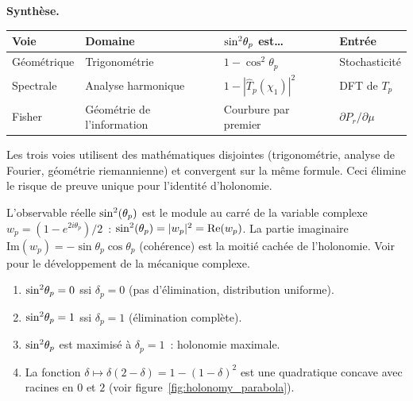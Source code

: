 \documentclass[12pt,a4paper]{article}
\begin{document}
\begin{remarque}
\medskip\noindent
\textbf{Synthèse.}
\begin{center}
\begin{tabular}{llll}
\toprule
\textbf{Voie} & \textbf{Domaine} & \textbf{$\sin^2\!\theta_{p}$ est\ldots} & \textbf{Entrée} \\
\midrule
Géométrique & Trigonométrie & $1 - \cos^2\!\theta_p$ & Stochasticité \\
Spectrale & Analyse harmonique & $1 - |\widehat{T}_p(\chi_1)|^2$ & DFT de $T_p$ \\
Fisher & Géométrie de l'information & Courbure par premier & $\partial P_r/\partial\mu$ \\
\bottomrule
\end{tabular}
\end{center}
Les trois voies utilisent des mathématiques disjointes
(trigonométrie, analyse de Fourier, géométrie riemannienne) et
convergent sur la même formule. Ceci élimine le risque de preuve
unique pour l'identité d'holonomie.
\end{remarque}

\begin{remarque}
L'observable réelle $\sin^2(\theta_{p})$ est le module au carré de la variable
complexe $w_p = (1 - e^{2i\theta_p})/2$~:
$\sin^2(\theta_{p}) = |w_p|^2 = \mathrm{Re}(w_p)$.
La partie imaginaire $\mathrm{Im}(w_p) = -\sin\theta_p\cos\theta_p$
(cohérence) est la moitié cachée de l'holonomie.
Voir~\cite{companion_M4} pour le développement de la mécanique
complexe.
\end{remarque}

\begin{remarque}[Propriétés]
\begin{enumerate}
\item $\sin^2\!\theta_{p} = 0$ ssi $\delta_p = 0$ (pas d'élimination,
  distribution uniforme).
\item $\sin^2\!\theta_{p} = 1$ ssi $\delta_p = 1$ (élimination complète).
\item $\sin^2\!\theta_{p}$ est maximisé à $\delta_p = 1$~: holonomie maximale.
\item La fonction $\delta \mapsto \delta(2-\delta) = 1-(1-\delta)^2$
  est une quadratique concave avec racines en $0$ et $2$
  (voir figure~\ref{fig:holonomy_parabola}).
\end{enumerate}
\end{remarque}
\end{document}
